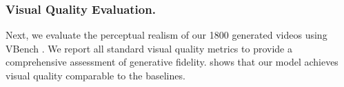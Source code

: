 \documentclass[10pt,twocolumn,letterpaper]{article}
\begin{document}
\subsubsection{Visual Quality Evaluation.}
Next, we evaluate the perceptual realism of our 1800 generated videos using VBench \cite{huang2023vbench}. We report all standard visual quality metrics to provide a comprehensive assessment of generative fidelity. 
 shows that our model achieves visual quality comparable to the baselines.


\begin{table}[t]
    \centering
    \caption{
        VBench visual-quality evaluation across six dimensions.
        Higher is better for all metrics. 
    }
    \vspace{-0.2cm}
    \label{tab:vbench_visual_only}
\end{table}

\end{document}
